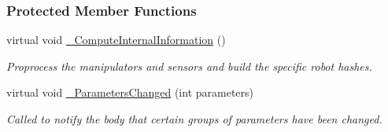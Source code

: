 \subsubsection*{Protected Member Functions}
\begin{DoxyCompactItemize}
\item 
\hypertarget{classOpenRAVE_1_1RobotBase_a3a10edb8cb573ac97bfed0e05dc2a29a}{
virtual void \hyperlink{classOpenRAVE_1_1RobotBase_a3a10edb8cb573ac97bfed0e05dc2a29a}{\_\-ComputeInternalInformation} ()}
\label{classOpenRAVE_1_1RobotBase_a3a10edb8cb573ac97bfed0e05dc2a29a}

\begin{DoxyCompactList}\small\item\em Proprocess the manipulators and sensors and build the specific robot hashes. \item\end{DoxyCompactList}\item 
virtual void \hyperlink{classOpenRAVE_1_1RobotBase_a218a09068212db7bb35c7d4ce792e309}{\_\-ParametersChanged} (int parameters)
\begin{DoxyCompactList}\small\item\em Called to notify the body that certain groups of parameters have been changed. \item\end{DoxyCompactList}\end{DoxyCompactItemize}
